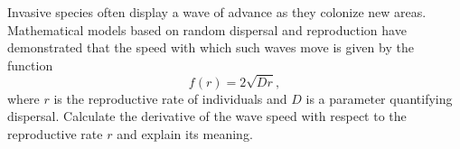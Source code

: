 \documentclass[12pt, addpoints]{exam/exam}
\newcommand{\1}{^{-1}}
\theoremstyle{plain}
\begin{document}
\begin{questions}
	
\newpage
\question[15] %
Invasive species often display a wave of advance as they colonize new areas.  Mathematical models based on random dispersal and reproduction have demonstrated that the speed with which such waves move is given by the function 
\[
f(r)=2\sqrt{Dr},
\]
where $r$ is the reproductive rate of individuals and $D$ is a parameter quantifying dispersal.  Calculate the derivative of the wave speed with respect to the reproductive rate $r$ and explain its meaning.

	
%	
%	


%	
%


\end{questions}
\end{document}
